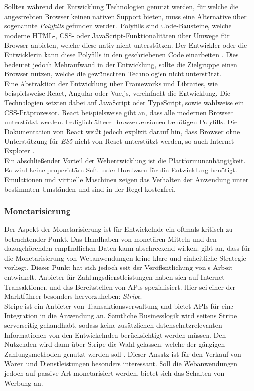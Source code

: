 \documentclass[a4paper]{scrartcl}
\begin{document}
Sollten während der Entwicklung Technologien genutzt werden, für welche die angestrebten Browser keinen nativen Support bieten, muss eine Alternative über sogenannte \textit{Polyfills} gefunden werden. Polyfills sind Code-Bausteine, welche moderne HTML-, CSS- oder JavaScript-Funktionalitäten über Umwege für Browser anbieten, welche diese nativ nicht unterstützen. Der Entwickler oder die Entwicklerin kann diese Polyfills in den geschriebenen Code einarbeiten \autocite{Polyfills}. Dies bedeutet jedoch Mehraufwand in der Entwicklung, sollte die Zielgruppe einen Browser nutzen, welche die gewünschten Technologien nicht unterstützt. \\

Eine Abstraktion der Entwicklung über Frameworks und Libraries, wie beispielsweise React, Angular oder Vue.js, vereinfacht die Entwicklung. Die Technologien setzten dabei auf JavaScript oder TypeScript, sowie wahlweise ein CSS-Präprozessor. React beispielsweise gibt an, dass alle modernen Browser unterstützt werden. Lediglich ältere Browserversionen benötigen Polyfills. Die Dokumentation von React weißt jedoch explizit darauf hin, dass Browser ohne Unterstützung für \textit{ES5} nicht von React unterstützt werden, so auch Internet Explorer \autocite{ReactDOM}. \\

Ein abschließender Vorteil der Webentwicklung ist die Plattformunanhängigkeit. Es wird keine properietäre Soft- oder Hardware für die Entwicklung benötigt. Emulationen und virtuelle Maschinen zeigen das Verhalten der Anwendung unter bestimmten Umständen und sind in der Regel kostenfrei. \\

\subsubsection{Monetarisierung}
Der Aspekt der Monetarisierung ist für Entwickelnde ein oftmals kritisch zu betrachtender Punkt. Das Handhaben von monetären Mitteln und den dazugehörenden empfindlichen Daten kann abschreckend wirken. \textcite[28]{Jobe} gibt an, dass für die Monetarisierung von Webanwendungen keine klare und einheitliche Strategie vorliegt. Dieser Punkt hat sich jedoch seit der Veröffentlichung von \textcite{Jobe}s Arbeit entwickelt. Anbieter für Zahlungsdienstleistungen haben sich auf Internet-Transaktionen und das Bereitstellen von APIs spezialisiert. Hier sei einer der Marktführer besonders hervorzuheben: \textit{Stripe}. \\
Stripe ist ein Anbieter von Transaktionsverwaltung und bietet APIs für eine Integration in die Anwendung an. Sämtliche Businesslogik wird seitens Stripe serverseitig gehandhabt, sodass keine zusätzlichen datenschutzrelevanten Informationen von den Entwickelnden berücksichtigt werden müssen. Den Nutzenden wird dann über Stripe die Wahl gelassen, welche der gängigen Zahlungsmethoden genutzt werden soll \autocite{Stripe}. Dieser Ansatz ist für den Verkauf von Waren und Dienstleistungen besonders interessant. Soll die Webanwendungen jedoch auf passive Art monetarisiert werden, bietet sich das Schalten von Werbung an. \\
\end{document}
